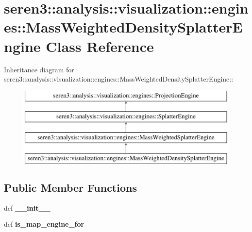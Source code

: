 \hypertarget{classseren3_1_1analysis_1_1visualization_1_1engines_1_1MassWeightedDensitySplatterEngine}{
\section{seren3::analysis::visualization::engines::MassWeightedDensitySplatterEngine Class Reference}
\label{classseren3_1_1analysis_1_1visualization_1_1engines_1_1MassWeightedDensitySplatterEngine}
}
Inheritance diagram for seren3::analysis::visualization::engines::MassWeightedDensitySplatterEngine::\begin{figure}[H]
\begin{center}
\leavevmode
\includegraphics[height=4cm]{classseren3_1_1analysis_1_1visualization_1_1engines_1_1MassWeightedDensitySplatterEngine}
\end{center}
\end{figure}
\subsection*{Public Member Functions}
\begin{DoxyCompactItemize}
\item 
\hypertarget{classseren3_1_1analysis_1_1visualization_1_1engines_1_1MassWeightedDensitySplatterEngine_a247eca4309e0d1fb64d165cceb0659e7}{
def {\bfseries \_\-\_\-init\_\-\_\-}}
\label{classseren3_1_1analysis_1_1visualization_1_1engines_1_1MassWeightedDensitySplatterEngine_a247eca4309e0d1fb64d165cceb0659e7}

\item 
\hypertarget{classseren3_1_1analysis_1_1visualization_1_1engines_1_1MassWeightedDensitySplatterEngine_a64e066f593b9feb1f0b306013e6c26f6}{
def {\bfseries is\_\-map\_\-engine\_\-for}}
\label{classseren3_1_1analysis_1_1visualization_1_1engines_1_1MassWeightedDensitySplatterEngine_a64e066f593b9feb1f0b306013e6c26f6}

\end{DoxyCompactItemize}


